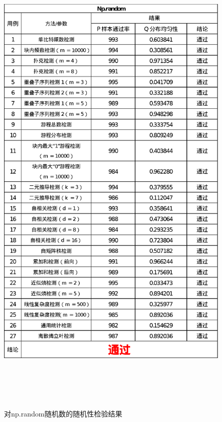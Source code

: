 \documentclass[12pt,a4paper]{article}%
\begin{document}
    \begin{figure}
        \centering
        \includegraphics[height=23.7cm]{Np.random}
        \caption{对np.random随机数的随机性检验结果}
        \label{fig:fig.4}
        \hypertarget{fig:fig.4}{}

    \end{figure}
\end{document}
